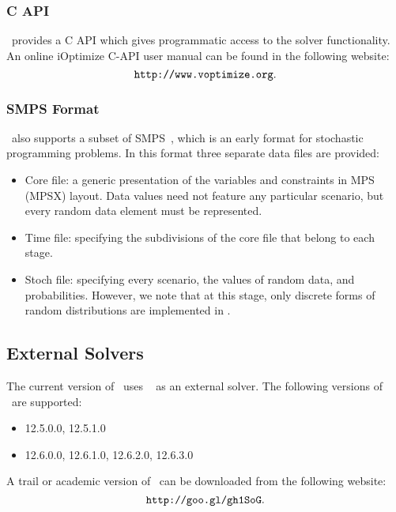 \subsubsection{C API}
\label{subsubsec:C API}

\IOP~provides a C API which gives programmatic access to the solver functionality. An online iOptimize C-API user manual can be found in the following website:
\[
    \mbox{\tt http://www.voptimize.org}.
\]

\subsubsection{SMPS Format}
\label{subsubsec:SMPS Format}

\IOP~also supports a subset of SMPS~\cite{Birge.Louveaux1997IntroductionToStochastic}, which is an early format for stochastic programming problems. In this format three separate data files are provided:

\begin{itemize}
  \item Core file: a generic presentation of the variables and constraints in MPS (MPSX) layout. Data values need not feature any particular scenario, but every random data element must be represented.
  \item Time file: specifying the subdivisions of the core file that belong to each stage.
  \item Stoch file: specifying every scenario, the values of random data, and probabilities. However, we note that at this stage, only discrete forms of random distributions are implemented in \IOP.
\end{itemize}

\subsection{External Solvers}
\label{subsec:External Solvers}
The current version of \IOP~uses \Cplex~\cite{IBMILogCplex} as an external solver. The following versions of \Cplex~are supported:
\begin{itemize}
  \item 12.5.0.0, 12.5.1.0
  \item 12.6.0.0, 12.6.1.0, 12.6.2.0, 12.6.3.0
\end{itemize}
A trail or academic version of \Cplex~can be downloaded from the following website:
\[
    \mbox{\tt http://goo.gl/gh1SoG}.
\]

